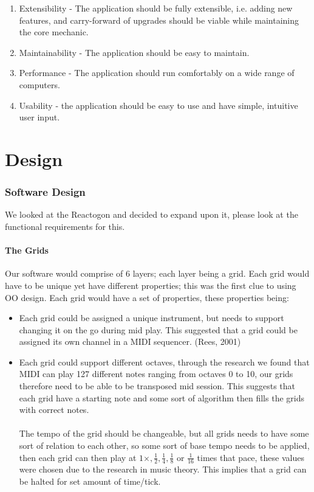\documentclass[10pt,a4paper]{article}
\begin{document}
\begin{enumerate}
\item Extensibility - The application should be fully extensible, i.e. adding new features, and carry-forward of upgrades should be viable while maintaining the core mechanic.
\item Maintainability - The application should be easy to maintain.
\item Performance - The application should run comfortably on a wide range of computers.
\item Usability - the application should be easy to use and have simple, intuitive user input.
\end{enumerate}

\part{Design}
\section{Software Design}
We looked at the Reactogon and decided to expand upon it, please look at the functional requirements for this.
\subsection{The Grids}
Our software would comprise of 6 layers; each layer being a grid. Each grid would have to be unique yet have different properties; this was the first clue to using OO design. Each grid would have a set of properties, these properties being:
\begin{itemize}
\item Each grid could be assigned a unique instrument, but needs to support changing it on the go during mid play. This suggested that a grid could be assigned its own channel in a MIDI sequencer. (Rees, 2001)

\item Each grid could support different octaves, through the research we found that MIDI can play 127 different notes ranging from octaves 0 to 10, our grids therefore need to be able to be transposed mid session. This suggests that each grid have a starting note and some sort of algorithm then fills the grids with correct notes.\\
\\
The tempo of the grid should be changeable, but all grids needs to have some sort of relation to each other, so some sort of base tempo needs to be applied, then each grid can then play at $ 1 \times , \frac{1}{2}, \frac{1}{4}, \frac{1}{8}$ or $\frac{1}{16} $ times that pace, these values were chosen due to the research in music theory. This implies that a grid can be halted for set amount of time/tick.
\end{itemize}
\end{document}
